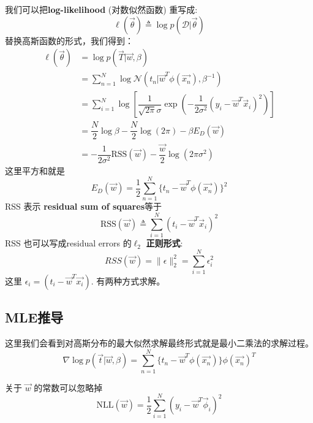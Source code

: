 \documentclass[a4paper]{article}
\begin{document}
我们可以把\textbf{log-likelihood} (对数似然函数) 重写成:
\begin{equation}
\ell(\vec{\theta}) \triangleq \log p(\mathcal{D}|\vec{\theta})
\end{equation}
替换高斯函数的形式，我们得到：
\begin{align}
\ell(\vec{\theta}) &= \log p(\vec{T}|\vec{w},\beta) \\
&=\sum_{n=1}^{N}\log \mathcal{N}(t_n|\vec{w}^T\phi(\vec{x_n}),\beta^{-1}) \\
&=\sum\limits_{i=1}^N \log\left[\dfrac{1}{\sqrt{2\pi}\sigma}\exp\left(-\dfrac{1}{2\sigma^2}(y_i-\vec{w}^T\vec{x}_i)^2\right)\right] \\
&=\dfrac{N}{2}\log \beta-\dfrac{N}{2}\log (2\pi)-\beta E_D(\vec{w}) \\
&=-\dfrac{1}{2\sigma^2}\text{RSS}(\vec{w})-\dfrac{\vec{w}}{2}\log(2\pi\sigma^2)
\end{align}
这里平方和就是
\begin{equation}
E_D(\vec{w}) =
\dfrac{1}{2}\sum_{n=1}^{N}\{t_n-\vec{w}^T\phi(\vec{x_n}) \}^2
\end{equation}
RSS 表示 \textbf{residual sum of squares}等于
\begin{equation}
\text{RSS}(\vec{w}) \triangleq \sum\limits_{i=1}^N (t_i-\vec{w}^T\vec{x}_i)^2
\end{equation}
RSS 也可以写成residual errors 的$\ell_2$ \textbf{正则形式}:
\begin{equation}
RSS(\vec{w}) = \parallel\epsilon\parallel_2^2 = \sum_{i=1}^{N}\epsilon_i^2
\end{equation}
这里 $\epsilon_i = (t_i - \vec{w}^T\vec{x_i})$.
有两种方式求解。
\subsection{MLE推导}
这里我们会看到对高斯分布的最大似然求解最终形式就是最小二乘法的求解过程。
\begin{equation}
\nabla\log p(\vec{t}|\vec{w},\beta)
=\sum_{n=1}^{N}\{t_n-\vec{w}^T\phi(\vec{x_n}) \}\phi(\vec{x_n})^T
\end{equation}

关于 $\vec{w}$ 的常数可以忽略掉
\begin{equation}
\text{NLL}(\vec{w}) = \dfrac{1}{2}\sum\limits_{i=1}^N (y_i-\vec{w}^T\vec{\phi}_i)^2
\end{equation}
\end{document}
